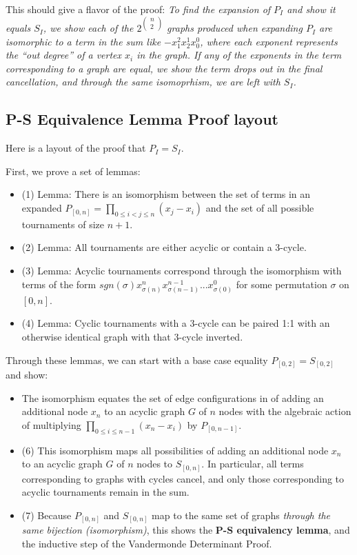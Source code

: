 \documentclass[11pt, oneside]{article} 	%
\begin{document}
This should give a flavor of the proof: \emph{To find the expansion of $P_I$ and show it equals $S_I$, we show each of the $2^{\begin{pmatrix}n \\ 2\end{pmatrix}}$ graphs produced when expanding $P_I$ are isomorphic to a term in the sum like $-x_1^2x_2^1x_0^0$, where each exponent represents the ``out degree'' of a vertex $x_i$ in the graph. If any of the exponents in the term corresponding to a graph are equal, we show the term drops out in the final cancellation, and through the same isomoprhism, we are left with $S_I$.}

\subsection{P-S Equivalence Lemma Proof layout}

Here is a layout of the proof that $P_I=S_I$.

First, we prove a set of lemmas:
\begin{itemize}
\item (1) Lemma: There is an isomorphism between the set of terms in an expanded $P_{[0,n]} =\prod_{0 \leq i < j \leq n}(x_j - x_i)$ and the set of all possible tournaments of size $n+1$.
\item (2) Lemma: All tournaments are either acyclic or contain a 3-cycle.
\item (3) Lemma: Acyclic tournaments correspond through the isomorphism with terms of the form $sgn(\sigma) x_{\sigma(n)}^nx_{\sigma(n-1)}^{n-1}  ... x_{\sigma(0)}^{0}$ for some permutation $\sigma$ on $[0,n]$.
\item (4) Lemma: Cyclic tournaments with a 3-cycle can be paired 1:1 with an otherwise identical graph with that 3-cycle inverted.
\end{itemize}

Through these lemmas, we can start with a base case equality $P_{[0,2]} = S_{[0,2]}$ and show:
\begin{itemize}
\item The isomorphism equates the set of edge configurations in of adding an additional node $x_n$ to an acyclic graph $G$ of $n$ nodes with the algebraic action of multiplying $\prod_{0 \leq i \leq n-1}(x_n-x_i)$ by $P_{[0,n-1]}$. 
\item (6) This isomorphism maps all possibilities of adding an additional node $x_n$ to an acyclic graph $G$ of $n$ nodes to $S_{[0,n]}$.  In particular, all terms corresponding to graphs with cycles cancel, and only those corresponding to acyclic tournaments remain in the sum.   
\item (7) Because $P_{[0,n]}$ and $S_{[0,n]}$ map to the same set of graphs \emph{through the same bijection (isomorphism)}, this shows the \textbf{P-S equivalency lemma}, and the inductive step of the Vandermonde Determinant Proof.
\end{itemize}
\end{document}

